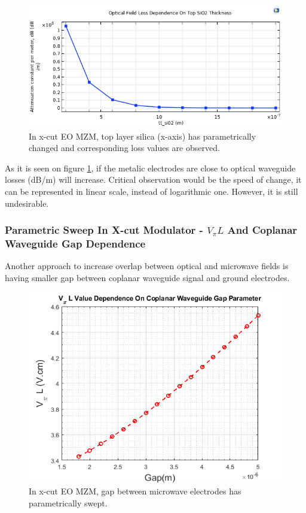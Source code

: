     \begin{figure}[h]
        \centering
        \includegraphics[width=0.75\linewidth]{x-cut-tt_sio2 loss.png}
        \caption{In x-cut EO MZM, top layer silica (x-axis) has parametrically changed and corresponding loss values are observed.}
        \label{fig:x-cut-tt_sio2-loss}
    \end{figure}

    As it is seen on figure \ref{fig:x-cut-tt_sio2-loss}, if the metalic electrodes are close to optical waveguide losses (dB/m) will increase. Critical observation would be the speed of change, it can be represented in linear scale, instead of logarithmic one. However, it is still undesirable.
    
    \subsubsection{Parametric Sweep In X-cut Modulator - $V_\pi L $ And Coplanar Waveguide Gap Dependence}

    Another approach to increase overlap between optical and microwave fields is having smaller gap between coplanar waveguide signal and ground electrodes. 
    
    \begin{figure}[h!]
        \centering
        \includegraphics[width=0.73\linewidth]{overlap_updated_v_piL_cpw_gap.png}
        \caption{In x-cut EO MZM, gap between microwave electrodes has parametrically swept.}
        \label{fig:voltage-gap-dependence-x-cut}
    \end{figure}

